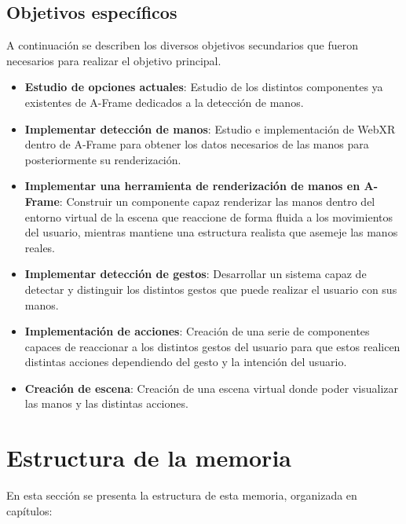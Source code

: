 \documentclass[a4paper, 12pt]{book}
\begin{document}
\subsection{Objetivos específicos}
\label{subsec:objetivos-especificos}
A continuación se describen los diversos objetivos secundarios que fueron necesarios para realizar el objetivo principal.
\begin{itemize}
  \item \textbf{Estudio de opciones actuales}: Estudio de los distintos componentes ya existentes de A-Frame dedicados a la detección de manos.
  \item \textbf{Implementar detección de manos}: Estudio e implementación de WebXR dentro de A-Frame para obtener los datos necesarios de las manos para posteriormente su renderización.
  \item \textbf{Implementar una herramienta de renderización de manos en A-Frame}: Construir un componente capaz renderizar las manos dentro del entorno virtual de la escena que reaccione de forma fluida a los movimientos del usuario, mientras mantiene una estructura realista que asemeje las manos reales. 
  \item \textbf{Implementar detección de gestos}: Desarrollar un sistema capaz de detectar y distinguir los distintos gestos que puede realizar el usuario con sus manos.
  \item \textbf{Implementación de acciones}: Creación de una serie de componentes capaces de reaccionar a los distintos gestos del usuario para que estos realicen distintas acciones dependiendo del gesto y la intención del usuario. 
  \item \textbf{Creación de escena}: Creación de una escena virtual donde poder visualizar las manos y las distintas acciones.
\end{itemize}

\section{Estructura de la memoria}
\label{subsec:estructura}
En esta sección se presenta la estructura de esta memoria, organizada en capítulos:
\end{document}
